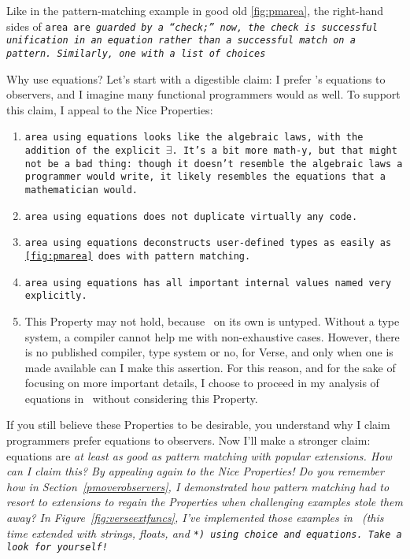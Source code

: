 \documentclass[manuscript,screen,review, 12pt, nonacm]{acmart}
\begin{document}
\begin{outline}[enumerate]
    Like in the pattern-matching example in good old \ref{fig:pmarea}, the
    right-hand sides of \tt{area} are \it{guarded} by a “check;” now, the check
    is successful unification in an equation rather than a successful match on a
    pattern. Similarly, \tt{one} with a list of choices 

    Why use equations? Let's start with a digestible claim: I prefer \VC's
    equations to observers, and I imagine many functional programmers would as
    well. To support this claim, I appeal to the Nice Properties: 

    \begin{enumerate}
      \item \tt{area} using equations looks like the algebraic laws, with the
      addition of the explicit $\exists$. It's a bit more math-y, but that might
      not be a bad thing: though it doesn't resemble the algebraic laws a
      programmer would write, it likely resembles the equations that a
      mathematician would. 
      \item \tt{area} using equations does not duplicate virtually any code. 
      \item \tt{area} using equations deconstructs user-defined types as easily
      as \ref{fig:pmarea} does with pattern matching. 
      \item \tt{area} using equations has all important internal values named
      very explicitly.
      \item This Property may not hold, because \VC\ on its own is untyped.
      Without a type system, a compiler cannot help me with non-exhaustive
      cases. However, there is no published compiler, type system or no, for
      Verse, and only when one is made available can I make this assertion. For
      this reason, and for the sake of focusing on more important details, I
      choose to proceed in my analysis of equations in \VC\ without considering
      this Property. 
    \end{enumerate}

    If you still believe these Properties to be desirable, you understand why I
    claim programmers prefer equations to observers. Now I'll make a stronger
    claim: equations are \it{at least as good as} pattern matching with popular
    extensions. How can I claim this? By appealing again to the Nice Properties!
    Do you remember how in Section~\ref{pmoverobservers}, I demonstrated how
    pattern matching had to resort to extensions to regain the Properties when
    challenging examples stole them away? In Figure~\ref{fig:verseextfuncs},
    I've implemented those examples in \VC\ (this time extended with strings,
    floats, and \tt{*}) using choice and equations. Take a look for yourself! 


\end{outline}
\end{document}
